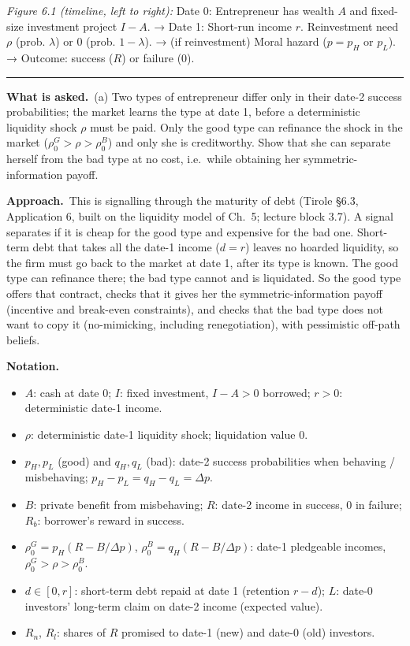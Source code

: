 \documentclass[11pt,a4paper]{article}
\newcommand{\notation}{\par\noindent\textbf{Notation.}}
\newcommand{\asked}{\par\medskip\noindent\textbf{What is asked.}~}
\newcommand{\approach}{\par\smallskip\noindent\textbf{Approach.}~}
\newcommand{\stmtend}{\par\endgroup\nopagebreak\noindent\rule{\linewidth}{0.4pt}\par\medskip}
\begin{document}
\emph{Figure 6.1 (timeline, left to right):} Date 0: Entrepreneur has wealth \(A\) and fixed-size
investment project \(I - A\). → Date 1: Short-run income \(r\). Reinvestment need \(\rho\) (prob.
\(\lambda\)) or 0 (prob. \(1 - \lambda\)). → (if reinvestment) Moral hazard (\(p = p_H\) or
\(p_L\)). → Outcome: success (\(R\)) or failure (0).
\stmtend

\asked (a) Two types of entrepreneur differ only in their date-2 success probabilities; the market learns the type at date 1, before a deterministic liquidity shock $\rho$ must be paid. Only the good type can refinance the shock in the market ($\rho_0^G>\rho>\rho_0^B$) and only she is creditworthy. Show that she can separate herself from the bad type at no cost, i.e.\ while obtaining her symmetric-information payoff.

\approach This is signalling through the maturity of debt (Tirole \S6.3, Application 6, built on the liquidity model of Ch.~5; lecture block 3.7). A signal separates if it is cheap for the good type and expensive for the bad one. Short-term debt that takes all the date-1 income ($d=r$) leaves no hoarded liquidity, so the firm must go back to the market at date 1, after its type is known. The good type can refinance there; the bad type cannot and is liquidated. So the good type offers that contract, checks that it gives her the symmetric-information payoff (incentive and break-even constraints), and checks that the bad type does not want to copy it (no-mimicking, including renegotiation), with pessimistic off-path beliefs.

\notation
\begin{itemize}
  \item $A$: cash at date 0; $I$: fixed investment, $I-A>0$ borrowed; $r>0$: deterministic date-1 income.
  \item $\rho$: deterministic date-1 liquidity shock; liquidation value $0$.
  \item $p_H,p_L$ (good) and $q_H,q_L$ (bad): date-2 success probabilities when behaving / misbehaving; $p_H-p_L=q_H-q_L=\Delta p$.
  \item $B$: private benefit from misbehaving; $R$: date-2 income in success, 0 in failure; $R_b$: borrower's reward in success.
  \item $\rho_0^G=p_H(R-B/\Delta p)$, $\rho_0^B=q_H(R-B/\Delta p)$: date-1 pledgeable incomes, $\rho_0^G>\rho>\rho_0^B$.
  \item $d\in[0,r]$: short-term debt repaid at date 1 (retention $r-d$); $L$: date-0 investors' long-term claim on date-2 income (expected value).
  \item $R_n$, $R_l$: shares of $R$ promised to date-1 (new) and date-0 (old) investors.
\end{itemize}
\end{document}
